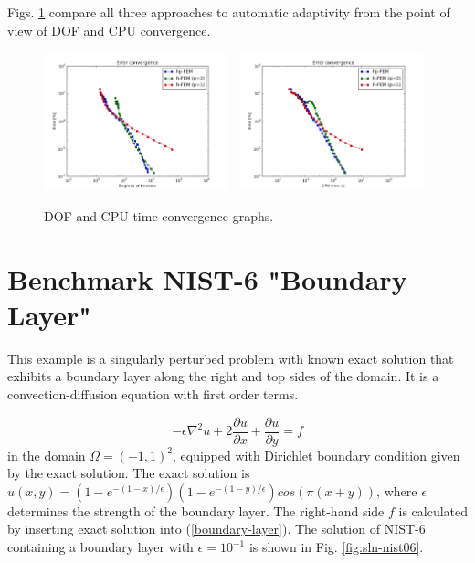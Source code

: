 \documentclass[12pt]{elsarticle}
\begin{document}
Figs. \ref{fig:nist-5-conv} compare all
three approaches to automatic adaptivity from the point
of view of DOF and CPU convergence.

\begin{figure}[H]
\centering
\includegraphics[height=4cm]{nist/nist-5/conv_dof_aniso.png}\ \
\includegraphics[height=4cm]{nist/nist-5/conv_cpu_aniso.png}
\caption{DOF and CPU time convergence graphs.}
\label{fig:nist-5-conv}
\vspace{-2mm}
\end{figure}


\section{Benchmark NIST-6 "Boundary Layer"}
\label{sec:bench-6}

This example is a singularly perturbed problem with known exact solution that exhibits
a boundary layer along the right and top sides of the domain.
It is a convection-diffusion equation with first order terms.

\begin{equation} \label{boundary-layer}
-\epsilon \nabla^{2} u + 2\frac{\partial u}{\partial x} + \frac{\partial u}{\partial y} = f
\end{equation}
in the domain $\Omega = (-1, 1)^2$, equipped with Dirichlet boundary condition
given by the exact solution. The exact solution is
$u(x,y) = (1 - e^{-(1 - x) / \epsilon})(1 - e^{-(1 - y) / \epsilon})cos(\pi (x + y))$,
where $\epsilon$ determines the strength of the boundary layer.
The right-hand side $f$ is calculated by inserting exact solution into (\ref{boundary-layer}).
The solution of NIST-6 containing a boundary layer
with $\epsilon = 10^{-1}$ is shown in Fig. \ref{fig:sln-nist06}.
\end{document}
